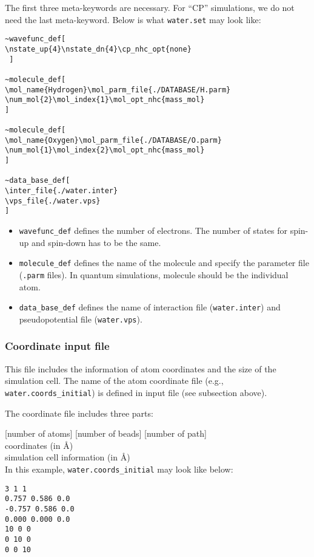 The first three meta-keywords are necessary. For ``CP'' simulations, we do not need the last meta-keyword. Below is what \verb+water.set+ may look like:

\begin{verbatim}
~wavefunc_def[
\nstate_up{4}\nstate_dn{4}\cp_nhc_opt{none}
 ]

~molecule_def[
\mol_name{Hydrogen}\mol_parm_file{./DATABASE/H.parm}
\num_mol{2}\mol_index{1}\mol_opt_nhc{mass_mol}
]

~molecule_def[
\mol_name{Oxygen}\mol_parm_file{./DATABASE/O.parm}
\num_mol{1}\mol_index{2}\mol_opt_nhc{mass_mol}
]

~data_base_def[
\inter_file{./water.inter}
\vps_file{./water.vps}
]
\end{verbatim}

\begin{itemize}
\item \verb+wavefunc_def+ defines the number of electrons. The number of states for spin-up and spin-down has to be the same. 

\item \verb+molecule_def+ defines the name of the molecule and specify the parameter file (\verb+.parm+ files). In quantum simulations, molecule should be the individual atom.

\item \verb+data_base_def+ defines the name of interaction file (\verb+water.inter+) and pseudopotential file (\verb+water.vps+).  

\end{itemize}

\subsubsection{Coordinate input file}
This file includes the information of atom coordinates and the size of the simulation cell. The name of the atom coordinate file (e.g., \verb+water.coords_initial+) is defined in input file (see subsection above).

The coordinate file includes three parts:

[number of atoms] [number of beads] [number of path]\\
coordinates (in \AA)\\
simulation cell information (in \AA)\\

In this example, \verb+water.coords_initial+ may look like below:

\begin{verbatim}
3 1 1
0.757 0.586 0.0
-0.757 0.586 0.0
0.000 0.000 0.0
10 0 0
0 10 0
0 0 10
\end{verbatim}

